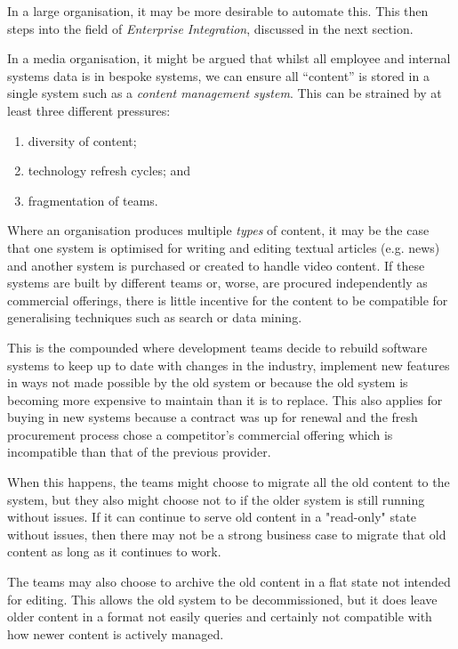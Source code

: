 In a large organisation, it may be more desirable to automate this. This then
steps into the field of \emph{Enterprise Integration}, discussed in the next
section.

In a media organisation, it might be argued that whilst all employee and
internal systems data is in bespoke systems, we can ensure all ``content''
is stored in a single system such as a \emph{content management system}. This
can be strained by at least three different pressures:

\begin{enumerate}
\item diversity of content;
\item technology refresh cycles; and
\item fragmentation of teams.
\end{enumerate}

Where an organisation produces multiple \emph{types} of content, it
may be the case that one system is optimised for writing and editing textual
articles (e.g. news) and another system is purchased or created to handle
video content. If these systems are built by different teams or, worse,
are procured independently as commercial offerings, there is little incentive
for the content to be compatible for generalising techniques such as search
or data mining.

This is the compounded where development teams decide to rebuild software
systems to keep up to date with changes in the industry, implement new features
in ways not made possible by the old system or because the old system is
becoming more expensive to maintain than it is to replace. This also applies
for buying in new systems because a contract was up for renewal and the fresh
procurement process chose a competitor's commercial offering which is
incompatible than that of the previous provider.

When this happens, the teams might choose to migrate all the old content to
the system, but they also might choose not to if the older system is still
running without issues. If it can continue to serve old content in a
"read-only" state without issues, then there may not be a strong business
case to migrate that old content as long as it continues to work.

The teams may also choose to archive the old content in a flat state not
intended for editing. This allows the old system to be decommissioned, but it
does leave older content in a format not easily queries and certainly not
compatible with how newer content is actively managed.

